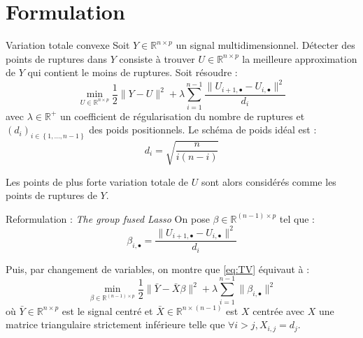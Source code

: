 \documentclass{beamer}
\theoremstyle{definition}
\newcommand{\RR}{\ensuremath{\mathbb{R}}}
\newcommand{\Zseq}[2]{\ensuremath{\left\{#1 , \dots, #2\right\}}}
\begin{document}
\section{Formulation}
	\begin{frame}[allowframebreaks]{\insertsection}
		\begin{block}{Variation totale convexe}
			Soit $Y\in\RR^{n\times p}$ un signal multidimensionnel. Détecter des points de ruptures dans $Y$ consiste à trouver $U\in\RR^{n\times p}$ la meilleure approximation de $Y$ qui contient le moins de ruptures. Soit résoudre :
			\begin{equation}
				\label{eq:TV}
				\min_{U\in\RR^{n\times p}} \frac{1}{2} \lVert Y - U \rVert^2 + \lambda \sum_{i=1}^{n-1}\frac{\lVert U_{i+1,\bullet} - U_{i,\bullet} \rVert^2}{d_i}
			\end{equation}	
			avec $\lambda \in \RR^+$ un coefficient de régularisation du nombre de ruptures et $(d_i)_{i \in \Zseq{1}{n-1}}$ des poids positionnels. Le schéma de poids idéal est :
			\begin{equation}
				d_i=\sqrt{\frac{n}{i(n-i)}}
			\end{equation}
		\end{block}
		Les points de plus forte variation totale de $U$ sont alors considérés comme les points de ruptures de $Y$.
			 
		\begin{block}{Reformulation : \textit{The group fused Lasso}}
			On pose $\beta \in \RR^{(n-1) \times p}$ tel que :
			\begin{equation}
				\beta_{i, \bullet} = \frac{\lVert U_{i+1,\bullet} - U_{i,\bullet} \rVert^2}{d_i}
			\end{equation}
			
			Puis, par changement de variables, on montre que \eqref{eq:TV} équivaut à :
			\begin{equation}
				\min_{\beta \in \RR^{(n-1) \times p}} \frac{1}{2} \lVert \bar{Y} - \bar{X} \beta \rVert^2 + \lambda \sum_{i=1}^{n-1} \lVert \beta_{i, \bullet} \rVert^2
			\end{equation}
			où $\bar{Y} \in \RR^{n \times p}$ est le signal centré et $\bar{X} \in \RR^{n \times (n-1)}$ est $X$ centrée avec $X$ une matrice triangulaire strictement inférieure telle que $\forall i>j, X_{i,j}=d_j$.
		\end{block}
	\end{frame}
\end{document}
